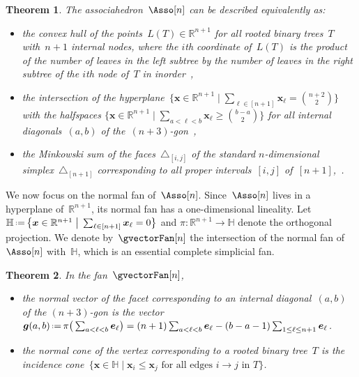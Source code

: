 \documentclass{amsart}
\newtheorem{theorem}{Theorem}[section]
\theoremstyle{definition}
\newcommand{\R}{\mathbb{R}} %
\newcommand{\HH}{\mathbb{H}} %
\renewcommand{\b}[1]{{\boldsymbol{#1}}} %
\newcommand{\bigset}[2]{\big\{ #1 \;\big|\; #2 \big\}} %
\newcommand{\eqdef}{\mbox{\,\raisebox{0.2ex}{\scriptsize\ensuremath{\mathrm:}}\ensuremath{=}\,}} %
\newcommand{\simplex}{\triangle} %
\newcommand{\gvector}[1]{\b{g}(#1)} %
\begin{document}
\begin{theorem}
\label{thm:associahedronLoday}
The associahedron~$\Asso[n]$ can be described equivalently as:
\begin{itemize}
\item the convex hull of the points~$L(T) \in \R^{n+1}$ for all rooted binary trees~$T$ with~$n+1$ internal nodes, where the $i$th coordinate of~$L(T)$ is the product of the number of leaves in the left subtree by the number of leaves in the right subtree of the $i$th node of~$T$ in inorder~\cite{Loday},
\item the intersection of the hyperplane~$\bigset{\b{x} \in \R^{n+1}}{\sum_{\ell \in [n+1]} \b{x}_\ell = \binom{n+2}{2}}$ with the halfspaces $\bigset{\b{x} \in \R^{n+1}}{\sum_{a < \ell < b} \b{x}_\ell \ge \binom{b-a}{2}}$ for all internal diagonals~$(a,b)$ of \mbox{the $(n+3)$-gon~\cite{ShniderSternberg}},
\item the Minkowski sum of the faces~$\simplex_{[i,j]}$ of the standard $n$-dimensional simplex~$\simplex_{[n+1]}$ corresponding to all proper intervals~$[i,j]$ of~$[n+1]$,~\cite{Postnikov}.
\end{itemize}
\end{theorem}

\pagebreak
We now focus on the normal fan of~$\Asso[n]$.
Since~$\Asso[n]$ lives in a hyperplane of~$\R^{n+1}$, its normal fan has a one-dimensional lineality.
Let~$\HH \eqdef \bigset{\b{x} \in \R^{n+1}}{\sum_{\ell \in [n+1]} \b{x}_\ell = 0}$ and ${\pi : \R^{n+1} \to \HH}$ denote the orthogonal projection. We denote by~$\gvectorFan[n]$ the intersection of the normal fan of~$\Asso[n]$ with~$\HH$, which is an essential complete simplicial fan.

\begin{theorem}
\label{thm:normalFanLoday}
In the fan~$\gvectorFan[n]$, 
\begin{itemize}
\item the normal vector of the facet corresponding to an internal diagonal~$(a,b)$ of the $(n+3)$-gon is the vector~$\gvector{a,b} \eqdef \pi\big( \sum_{a < \ell < b} \b{e}_\ell \big) = (n+1) \sum_{a < \ell < b} \b{e}_\ell - (b-a-1) \sum_{1 \le \ell \le n+1} \b{e}_\ell$.
\item the normal cone of the vertex corresponding to a rooted binary tree~$T$ is the incidence cone~$\bigset{\b{x} \in \HH}{\b{x}_i \le \b{x}_j \text{ for all edges $i \to j$ in $T$}}$.
\end{itemize}
\end{theorem}
\end{document}
